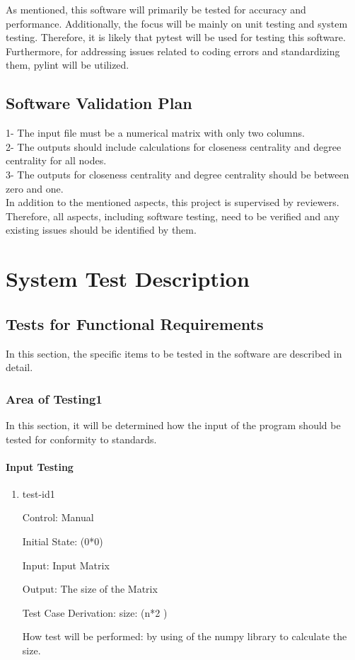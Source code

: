 \documentclass[12pt, titlepage]{article}
\begin{document}
As mentioned, this software will primarily be tested for accuracy and performance. Additionally, the focus will be mainly on unit testing and system testing. Therefore, it is likely that pytest will be used for testing this software. Furthermore, for addressing issues related to coding errors and standardizing them, pylint will be utilized.

\subsection{Software Validation Plan}

1- The input file must be a numerical matrix with only two columns.\\
2- The outputs should include calculations for closeness centrality and degree  centrality for all nodes.\\
3- The outputs for closeness centrality and degree  centrality should be between zero and one.\\
In addition to the mentioned aspects, this project is supervised by reviewers. Therefore, all aspects, including software testing, need to be verified and any existing issues should be identified by them.

\section{System Test Description}
	
\subsection{Tests for Functional Requirements}
In this section, the specific items to be tested in the software are described in detail.


\subsubsection{Area of Testing1}
In this section, it will be determined how the input of the program should be tested for conformity to standards.
		
\paragraph{Input Testing}

\begin{enumerate}

\item{test-id1\\}

Control: Manual
					
Initial State: (0*0) 
					
Input: Input Matrix
					
Output: The size of the Matrix

Test Case Derivation: size: (n*2 )
					
How test will be performed:  by using of the numpy library to calculate the size.
					

\end{enumerate}
\end{document}
